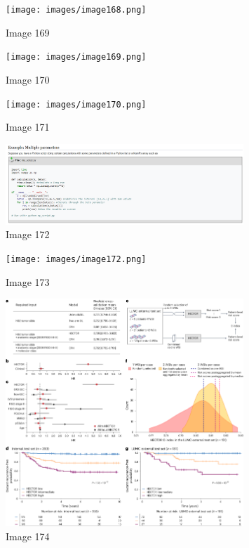 \documentclass{article}%
\begin{document}
%


\begin{figure}[h!]%
\centering%
\texttt{[image: images/image168.png]}%
\caption{Image 169}%
\end{figure}

%


\begin{figure}[h!]%
\centering%
\texttt{[image: images/image169.png]}%
\caption{Image 170}%
\end{figure}

%


\begin{figure}[h!]%
\centering%
\texttt{[image: images/image170.png]}%
\caption{Image 171}%
\end{figure}

%


\begin{figure}[h!]%
\centering%
\includegraphics[width=0.8\textwidth]{images/image171.png}%
\caption{Image 172}%
\end{figure}

%


\begin{figure}[h!]%
\centering%
\texttt{[image: images/image172.png]}%
\caption{Image 173}%
\end{figure}

%


\begin{figure}[h!]%
\centering%
\includegraphics[width=0.8\textwidth]{images/image173.png}%
\caption{Image 174}%
\end{figure}
\end{document}
